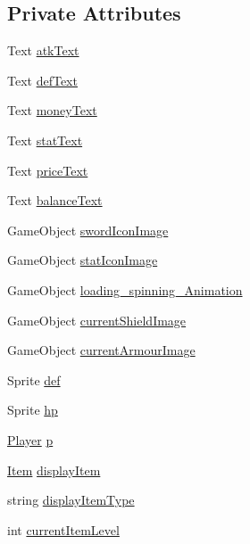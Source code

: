 \subsection*{Private Attributes}
\begin{DoxyCompactItemize}
\item 
Text \mbox{\hyperlink{class_inventory_a6be0183125fd410aab7aeaf701db4741}{atk\+Text}}
\item 
Text \mbox{\hyperlink{class_inventory_aa126dcd06ebf1ea9eec5aa6ca1e83a8d}{def\+Text}}
\item 
Text \mbox{\hyperlink{class_inventory_aa93a5a923daa1233401192da490e8e27}{money\+Text}}
\item 
Text \mbox{\hyperlink{class_inventory_a00da1044a0d829c9b8e0156f8b059db7}{stat\+Text}}
\item 
Text \mbox{\hyperlink{class_inventory_a357c419671e7cb628288360cc7acd604}{price\+Text}}
\item 
Text \mbox{\hyperlink{class_inventory_a904e3fced18e5366bb5b89c7e4262874}{balance\+Text}}
\item 
Game\+Object \mbox{\hyperlink{class_inventory_af9d04c9febb8280182f03d1ccdc14fa8}{sword\+Icon\+Image}}
\item 
Game\+Object \mbox{\hyperlink{class_inventory_a93a55231b5b247c2e7b0dfee9ce2dd3d}{stat\+Icon\+Image}}
\item 
Game\+Object \mbox{\hyperlink{class_inventory_a1d9b045b21d5bd72f6a6f6a94d535c72}{loading\+\_\+spinning\+\_\+\+Animation}}
\item 
Game\+Object \mbox{\hyperlink{class_inventory_a945eba3f91aa5a429eaa74502fe71bbc}{current\+Shield\+Image}}
\item 
Game\+Object \mbox{\hyperlink{class_inventory_a7fe90f0ee39e013f8c318327e20f85f1}{current\+Armour\+Image}}
\item 
Sprite \mbox{\hyperlink{class_inventory_a62372c6936045f41bfa87a95c1aec3c8}{def}}
\item 
Sprite \mbox{\hyperlink{class_inventory_aed66b242ae5cf8df814b5d30bf20a6b3}{hp}}
\item 
\mbox{\hyperlink{class_player}{Player}} \mbox{\hyperlink{class_inventory_a2b3ce9cd39d106439c316059a190782f}{p}}
\item 
\mbox{\hyperlink{class_item}{Item}} \mbox{\hyperlink{class_inventory_aa1d8741824496d71e52c6f87de2c1533}{display\+Item}}
\item 
string \mbox{\hyperlink{class_inventory_aeef6e41606f68069f4b44ab4a46bcc59}{display\+Item\+Type}}
\item 
int \mbox{\hyperlink{class_inventory_ae1830fc12251f73f70b9d5bb7986273b}{current\+Item\+Level}}
\end{DoxyCompactItemize}


